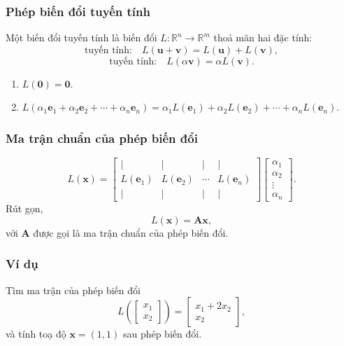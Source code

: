 \begin{frame}
    \frametitle{Phép biến đổi tuyến tính}
    \begin{tcolorbox}[colback=blue!10, colframe=blue!50!black, title=Định nghĩa]
        Một biến đổi tuyến tính là biến đổi \(L: \mathbb{R}^n \rightarrow\mathbb{R}^m\) thoả mãn hai đặc tính:
    \[\text{tuyến tính:}\quad L(\mathbf{u}+\mathbf{v})=L(\mathbf{u})+L(\mathbf{v}),\]
    \[\text{tuyến tính:}\quad L(\alpha\mathbf{v})=\alpha L(\mathbf{v}).\]
    \end{tcolorbox}
    \begin{enumerate}
    \item \(L(\mathbf{0})=\mathbf{0}\).
    \item \(L(\alpha_{1}\mathbf{e}_1+\alpha_2 \mathbf{e}_2 +\cdots +\alpha_n \mathbf{e}_{n})=\alpha_1 L(\mathbf{e}_1)+\alpha_2 L(\mathbf{e}_2)+\cdots +\alpha_n L(\mathbf{e}_n)\).
\end{enumerate}
\end{frame}
\begin{frame}
    \frametitle{Ma trận chuẩn của phép biến đổi}
    \begin{equation}
        L(\mathbf{x})=\begin{bmatrix}
    \lvert & \lvert &\lvert &\lvert\\
    L(\mathbf{e}_1)&L(\mathbf{e}_2)&\cdots&L(\mathbf{e}_n)\\
     \lvert & \lvert &\lvert &\lvert
\end{bmatrix}\begin{bmatrix}
    \alpha_1 \\\alpha_2 \\\vdots\\ \alpha_n
\end{bmatrix}.
    \end{equation}
Rút gọn,
    \[L(\mathbf{x})=\mathbf{A}\mathbf{x},\]
    với \(\mathbf{A}\) được gọi là ma trận chuẩn của phép biến đổi.
\end{frame}
\begin{frame}
    \frametitle{Ví dụ}
    Tìm ma trận của phép biến đổi 
    \[L\left(\begin{bmatrix}
    x_1 \\x_2
\end{bmatrix}\right)=\begin{bmatrix}
    x_1 +2x_2 \\x_2
\end{bmatrix},\]
và tính toạ độ \(\mathbf{x}=(1,1)\) sau phép biến đổi.
\end{frame}
